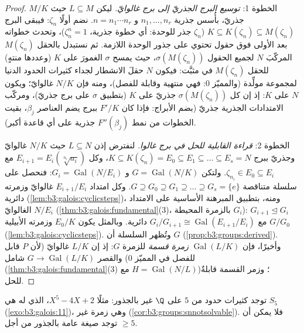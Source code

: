 \begin{proof}
الخطوة 1: \emph{توسيع البرج الجذريّ إلى برج غالوايّ.} ليكن
$L
\subseteq M$ حيث $M/K$ جذريّ، بأُسس جذرية $n_1, \dots,
n_r$ و $n = n_1\cdots n_r$. نضم
أولًا $\zeta_n$: فيبقى البرج $K \subseteq K(\zeta_n) \subseteq M(\zeta_n)$  ($\zeta_n$ جذر
للوحدة: أي خطوة جذرية، $\zeta_n^n = 1$)، وتحدث خطواته بعد الأولى
فوق حقول تحتوي على جذور الوحدة اللازمة. ثم نستبدل بالحقل $M(\zeta_n)$
المركّبَ $N$ لجميع الحقول $\sigma(M(\zeta_n))$، حيث يمسح $\sigma$ الغمورَ
على $K$ (وعددها منتهٍ) للحقل $M(\zeta_n)$ في  مثبَّت:
فيكون $N$ حقلَ الانشطار لجداء كثيرات الحدود الدنيا لمجموعة
مولِّدة (والمميّز $0$: فهي منتهية وقابلة للفصل)، ومنه فإن $N/K$
غالوايّ؛ ويكون $N$  على $K$: إذ إن كل $\sigma(M(\zeta_n))$ جذريّ على
$K$ (بتطبيق $\sigma$ على برج جذريّ)، ومركّب الامتدادات الجذرية
جذريّ (بضم الأبراج: فإذا كان $F'/K$  ببرج يضم العناصر
$\beta_j$، بقيت الخطوات من نمط $F''(\beta_j)$ جذرية على أي
قاعدة أكبر).

الخطوة 2: \emph{قراءة القابلية للحل في برج غالوا.} لنفترض إذن
$L \subseteq N$ حيث $N/K$ غالوايّ وجذريّ ببرج $K
\subseteq K(\zeta_n) = E_0 \subseteq E_1 \subseteq \dots
\subseteq E_s = N$، وكل
$E_{i+1} = E_i(\sqrt[n_i]{a_i})$ مع $\zeta_{n_i} \in E_0 \subseteq E_i$. ولتكن $G =
\operatorname{Gal}(N/K)$ و $G_i = \operatorname{Gal}(N/E_i)$: فنحصل على سلسلة
متناقصة $G \supseteq G_0 \supseteq G_1 \supseteq
\dots \supseteq G_s = \{e\}$. وكل امتداد $E_{i+1}/E_i$ غالوايّ وزمرته دائرية
(\cref{lem:b3:galois:cyclicsteps})، ومنه، بتطبيق المبرهنة الأساسية على الامتداد
الغالوايّ $N/E_i$ (\cref{thm:b3:galois:fundamental}(3)، بالزمرة المحيطة $G_i$):
$G_{i+1} \trianglelefteq G_i$ مع $G_i/G_{i+1} \cong
\operatorname{Gal}(E_{i+1}/E_i)$ دائرية. وبالمثل يكون $E_0/K$ 
وزمرته الأبيلية $G/G_0$ (\cref{lem:b3:galois:cyclicsteps}). وتُظهر السلسلة أن $G$
 (\cref{prop:b3:groups:derived}). وأخيرًا، فإن $\operatorname{Gal}(L/K)$ \emph{زمرة
قسمة} للزمرة $G$: إذ إن $L/K$ غالوايّ (لأن $P$ قابل للفصل في المميّز
$0$) والقصر $G
\to \operatorname{Gal}(L/K)$ شامل (\cref{thm:b3:galois:fundamental}(3) مع $H =
\operatorname{Gal}(N/L)$)؛ وزمر
القسمة  قابلةٌ للحل.
\end{proof}

\begin{corollary}
\label{cor:b3:galois:quintic}
توجد كثيرات حدود من  $5$ على $\Q$ غير  بالجذور:
مثلًا $X^5 - 4X + 2$، الذي  له هي $S_5$
(\cref{exo:b3:galois:11})، وهي زمرة غير  (\cref{cor:b3:groups:snnotsolvable}). فلا يمكن
أن توجد صيغة عامة بالجذور من أجل  $\geq 5$.
\end{corollary}

